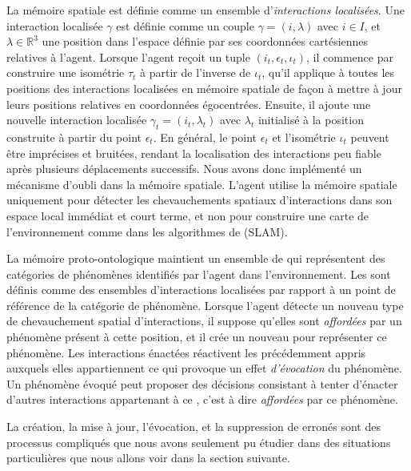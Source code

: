La mémoire spatiale est définie comme un ensemble d'\emph{interactions localisées}.
Une interaction localisée $\gamma$ est définie comme un couple $\gamma = (i, \lambda)$ avec $i \in I$, et $\lambda \in \mathbb{R}^3$ une position dans l'espace définie par ses coordonnées cartésiennes relatives à l'agent. 
Lorsque l'agent reçoit un tuple $(i_t, \epsilon_t, \iota_t)$, il commence par construire une isométrie $\tau_t$ à partir de l'inverse de $\iota_t$, qu'il applique à toutes les positions des interactions localisées en mémoire spatiale de façon à mettre à jour leurs positions relatives en coordonnées égocentrées.
Ensuite, il ajoute une nouvelle interaction localisée $\gamma_t = (i_t, \lambda_t)$ avec $\lambda_t$ initialisé à la position construite à partir du point $\epsilon_t$. 
En général, le point $\epsilon_t$ et l'isométrie $\iota_t$ peuvent être imprécises et bruitées, rendant la localisation des interactions peu fiable après plusieurs déplacements successifs. 
Nous avons donc implémenté un mécanisme d'oubli dans la mémoire spatiale.
L'agent utilise la mémoire spatiale uniquement pour détecter les chevauchements spatiaux d'interactions dans son espace local immédiat et court terme, et non pour construire une carte de l'environnement comme dans les algorithmes de  (SLAM).

La mémoire proto-ontologique maintient un ensemble de  qui représentent des catégories de phénomènes identifiés par l'agent dans l'environnement. 
Les  sont définis comme des ensembles d'interactions localisées par rapport à un point de référence de la catégorie de phénomène.  
Lorsque l'agent détecte un nouveau type de chevauchement spatial d'interactions, il suppose qu'elles sont \emph{affordées} par un phénomène présent à cette position, et il crée un nouveau  pour représenter ce phénomène. 
Les interactions énactées réactivent les  précédemment appris auxquels elles appartiennent ce qui provoque un effet \emph{d'évocation} du phénomène. 
Un phénomène évoqué peut proposer des décisions consistant à tenter d'énacter d'autres interactions appartenant à ce , c'est à dire \emph{affordées} par ce phénomène.  


La création, la mise à jour, l'évocation, et la suppression de  erronés sont des processus compliqués que nous avons seulement pu étudier dans des situations particulières que nous allons voir dans la section suivante. 




